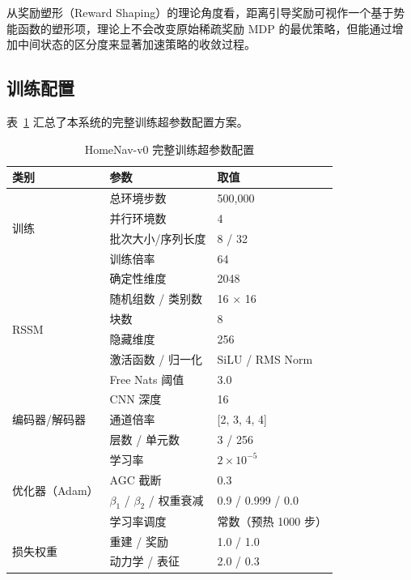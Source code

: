 \documentclass[12pt,a4paper]{ctexart}
\begin{document}
从奖励塑形（Reward Shaping）的理论角度看，距离引导奖励可视作一个基于势能函数的塑形项，理论上不会改变原始稀疏奖励 MDP 的最优策略，但能通过增加中间状态的区分度来显著加速策略的收敛过程。

\subsection{训练配置}

表~\ref{tab:config} 汇总了本系统的完整训练超参数配置方案。

\begin{table}[H]
    \centering
    \small
    \renewcommand{\arraystretch}{0.85}
    \caption{HomeNav-v0 完整训练超参数配置}
    \label{tab:config}
    \begin{tabular}{@{}lll@{}}
        \toprule
        \textbf{类别} & \textbf{参数} & \textbf{取值} \\
        \midrule
        \multirow{4}{*}{训练} & 总环境步数 & 500,000 \\
        & 并行环境数 & 4 \\
        & 批次大小/序列长度 & 8 / 32 \\
        & 训练倍率 & 64 \\
        \midrule
        \multirow{6}{*}{RSSM}         & 确定性维度 & 2048 \\
        & 随机组数 / 类别数 & 16 $\times$ 16 \\
        & 块数 & 8 \\
        & 隐藏维度 & 256 \\
        & 激活函数 / 归一化 & SiLU / RMS Norm \\
        & Free Nats 阈值 & 3.0 \\
        \midrule
        \multirow{3}{*}{编码器/解码器} & CNN 深度 & 16 \\
        & 通道倍率 & [2, 3, 4, 4] \\
        & 层数 / 单元数 & 3 / 256 \\
        \midrule
        \multirow{4}{*}{优化器（Adam）} & 学习率 & $2\times 10^{-5}$ \\
        & AGC 截断 & 0.3 \\
        & $\beta_1$ / $\beta_2$ / 权重衰减 & 0.9 / 0.999 / 0.0 \\
        & 学习率调度 & 常数（预热 1000 步） \\
        \midrule
        \multirow{4}{*}{损失权重} & 重建 / 奖励 & 1.0 / 1.0 \\
        & 动力学 / 表征 & 2.0 / 0.3 \\

\end{tabular}
\end{table}
\end{document}
